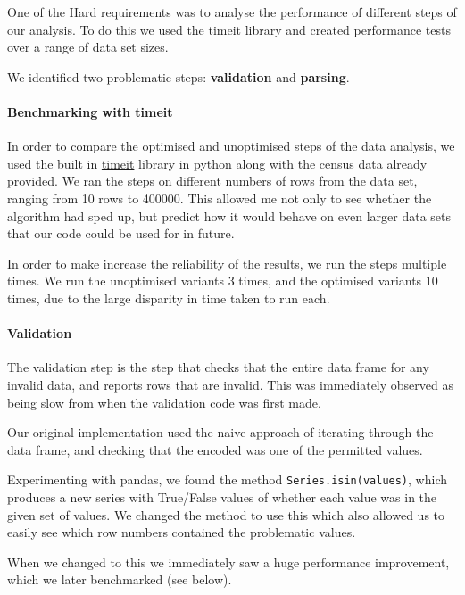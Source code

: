 \documentclass[11pt]{article}
\begin{document}
One of the Hard requirements was to analyse the performance of different
steps of our analysis. To do this we used the timeit library and created
performance tests over a range of data set sizes.

We identified two problematic steps: \textbf{validation} and
\textbf{parsing}.

\paragraph{Benchmarking with timeit}\label{benchmarking-with-timeit}

In order to compare the optimised and unoptimised steps of the data
analysis, we used the built in
\href{https://docs.python.org/3/library/timeit.html}{timeit} library in
python along with the census data already provided. We ran the steps on
different numbers of rows from the data set, ranging from 10 rows to
400000. This allowed me not only to see whether the algorithm had sped
up, but predict how it would behave on even larger data sets that our
code could be used for in future.

In order to make increase the reliability of the results, we run the
steps multiple times. We run the unoptimised variants 3 times, and the
optimised variants 10 times, due to the large disparity in time taken to
run each.

\paragraph{Validation}\label{validation}

The validation step is the step that checks that the entire data frame
for any invalid data, and reports rows that are invalid. This was
immediately observed as being slow from when the validation code was
first made.

Our original implementation used the naive approach of iterating through
the data frame, and checking that the encoded was one of the permitted
values.

Experimenting with pandas, we found the method
\texttt{Series.isin(values)}, which produces a new series with
True/False values of whether each value was in the given set of values.
We changed the method to use this which also allowed us to easily see
which row numbers contained the problematic values.

When we changed to this we immediately saw a huge performance
improvement, which we later benchmarked (see below).
\end{document}
